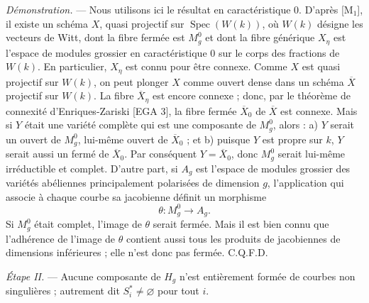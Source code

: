 \documentclass[10pt]{article}
\newcommand{\Spec}{\operatorname{Spec}}
\begin{document}
\noindent\emph{Démonstration.} --- Nous utilisons ici le résultat en caractéristique $0$. D'après [M$_1$], il existe un schéma $X$, quasi projectif sur $\Spec(W(k))$, où $W(k)$ désigne les vecteurs de Witt, dont la fibre fermée est $M_g^0$ et dont la fibre générique $X_\eta$ est l'espace de modules grossier en caractéristique $0$ sur le corps des fractions de $W(k)$. En particulier, $X_\eta$ est connu pour être connexe. Comme $X$ est quasi projectif sur $W(k)$, on peut plonger $X$ comme ouvert dense dans un schéma $\overline X$ projectif sur $W(k)$. La fibre $\overline X_\eta$ est encore connexe ; donc, par le théorème de connexité d'Enriques-Zariski [EGA 3], la fibre fermée $\overline X_0$ de $\overline X$ est connexe. Mais si $Y$ était une variété complète qui est une composante de $M_g^0$, alors : a) $Y$ serait un ouvert de $M_g^0$, lui-même ouvert de $\overline X_0$ ; et b) puisque $Y$ est propre sur $k$, $Y$ serait aussi un fermé de $\overline X_0$. Par conséquent $Y=\overline X_0$, donc $M_g^0$ serait lui-même irréductible et complet. D'autre part, si $A_g$ est l'espace de modules grossier des variétés abéliennes principalement polarisées de dimension $g$, l'application qui associe à chaque courbe sa jacobienne définit un morphisme
\[
\theta:M_g^0\to A_g.
\]
Si $M_g^0$ était complet, l'image de $\theta$ serait fermée. Mais il est bien connu que l'adhérence de l'image de $\theta$ contient aussi tous les produits de jacobiennes de dimensions inférieures ; elle n'est donc pas fermée. C.Q.F.D.

\medskip
\noindent\emph{Étape II.} --- Aucune composante de $H_g$ n'est entièrement formée de courbes non singulières ; autrement dit $S_i^*\ne\varnothing$ pour tout $i$.
\end{document}
